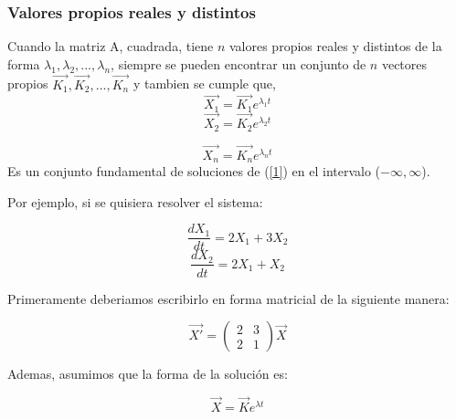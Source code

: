 \documentclass[titlepage]{article}
\begin{document}
            \subsubsection{Valores propios reales y distintos}
                Cuando la matriz A, cuadrada, tiene $n$ valores propios reales y distintos de la forma $\lambda_1,\lambda_2,...,\lambda_n$, siempre se pueden encontrar un conjunto de $n$ vectores propios $\vec{K_1},\vec{K_2},...,\vec{K_n}$ y tambien se cumple que, 
                \begin{equation*}
                    \vec{X_1} = \vec{K_1}e^{\lambda_1t}
                \end{equation*}
                \begin{equation*}
                    \vec{X_2} = \vec{K_2}e^{\lambda_2t}
                \end{equation*}
            
                \begin{equation*}
                    \vec{X_n} = \vec{K_n}e^{\lambda_nt}
                \end{equation*}
                Es un conjunto fundamental de soluciones de (\ref{1}) en el intervalo ($-\infty,\infty$).\vspace{0.1cm}
                
          Por ejemplo, si se quisiera resolver el sistema:
          
          		\begin{equation*}
          		      \frac{dX_1}{dt} = 2X_1 + 3X_2 
          		          		          										\end{equation*}
          		\begin{equation*}
          		      \frac{dX_2}{dt} = 2X_1 + X_2
      			\end{equation*}
      			
      		Primeramente deberiamos escribirlo en forma matricial de la siguiente manera:
      		
      		\begin{equation*}
      			\vec{X'} =
      			\begin{pmatrix}
      				2 & 3 \\
      				2 & 1
      			\end{pmatrix}
      				\vec{X}
      		\end{equation*}
      		
      	Ademas, asumimos que la forma de la solución es:
      	
      		\begin{equation*}
      			\vec{X} = \vec{K}e^{\lambda t}
      		\end{equation*}
      		
\end{document}
